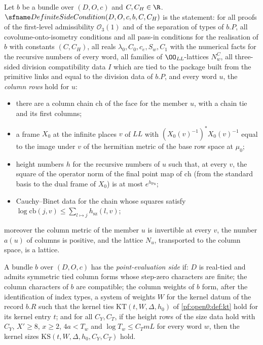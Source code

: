 \begin{definition}\label{pf:open0:def:df}
Let $b$ be a bundle over $(D,O,c)$ and $C,C_H\in\R$. $\openzeroDF(D,O,c,b,C,C_H)$ is the statement: for all proofs of the
first-level admissibility $\mathcal O_3(1)$ and of the separation of types of $b.P$, all covolume-onto-isometry conditions and all
pass-in conditions for the realisation of $b$ with constants $(C,C_H)$, all reals $\lambda_0,C_0,c_e,S_w,C_1$ with the
numerical facts for the recursive numbers of every word, all families of $\OO_{\mathit{LL}}$-lattices $N^C_w$, all
three-sided division compatibility data $I$ which are tied to the package built from the primitive links and equal to the
division data of $b.P$, and every word $u$, the \emph{column rows} hold for $u$:
\begin{itemize}
\item there are a column chain $\mathrm{ch}$ of the face for the member $u$, with a chain tie and its first columns;
\item a frame $X_0$ at the infinite places $v$ of $\mathit{LL}$ with $(X_0(v)^{-1})^*X_0(v)^{-1}$ equal to the image under $v$ of the
hermitian metric of the base row space at $\mu_0$;
\item height numbers $h$ for the recursive numbers of $u$ such that, at every $v$, the square of the operator norm of the final
point map of $\mathrm{ch}$ (from the standard basis to the dual frame of $X_0$) is at most $e^{h_{\mathrm{Pn}}}$;
\item Cauchy--Binet data for the chain whose squares satisfy $\log\mathrm{cb}(j,v)\le\sum_{l\mapsto j}h_{\mathrm{sz}}(l,v)$;
\end{itemize}
moreover the column metric of the member $u$ is invertible at every $v$, the number $a(u)$ of columns is positive, and the
lattice $N_u$, transported to the column space, is a lattice.
\end{definition}

\begin{definition}\label{pf:open0:def:pes}
A bundle $b$ over $(D,O,c)$ has the \emph{point-evaluation side} if: $D$ is real-tied and admits symmetric tied column forms whose
step-zero characters are finite; the column characters of $b$ are compatible; the column weights of $b$ form, after the
identification of index types, a system of weights $W$ for the kernel datum of the record $b.R$ such that the kernel ties
$\mathrm{KT}(t,W,\Delta,h_0)$ of \cref{pf:open0:def:kt} hold for its kernel entry $t$; and for all $C_Y,C_T$, if the height rows of the size
data hold with $C_Y$, $X'\ge8$, $x\ge2$, $4a<T_w$ and $\log T_w\le C_TmL$ for every word $w$, then the kernel sizes
$\mathrm{KS}(t,W,\Delta,h_0,C_Y,C_T)$ hold.
\end{definition}

